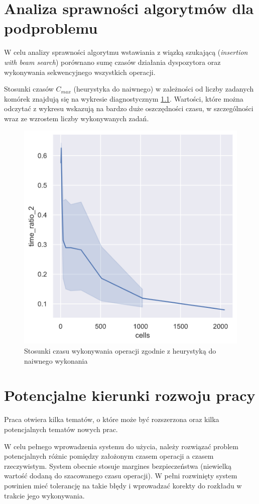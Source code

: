 \documentclass[brudnopis]{xmgr}
\begin{document}
\chapter{Analiza sprawności algorytmów dla podproblemu}

W celu analizy sprawności algorytmu wstawiania z wiązką szukającą (\emph{insertion with beam search}) porównano sumę czasów działania dyspozytora oraz wykonywania sekwencyjnego wszystkich operacji.

Stosunki czasów $C_{max}$ (heurystyka do naiwnego) w zależności od liczby zadanych komórek znajdują się na wykresie diagnostycznym \ref{diag:time_ratio_2}. Wartości, które można odczytać z wykresu wskazują na bardzo duże oszczędności czasu, w szczególności wraz ze wzrostem liczby wykonywanych zadań.

\begin{figure}[!tbh]
\centering
\includegraphics[width=.7\hsize]{fig/time_ratio_2.png}
\caption{Stosunki czasu wykonywania operacji zgodnie z heurystyką do naiwnego wykonania \label{diag:time_ratio_2}}
\end{figure}\medskip



\chapter{Potencjalne kierunki rozwoju pracy} \label{chap:extend}

Praca otwiera kilka tematów, o które może być rozszerzona oraz kilka potencjalnych tematów nowych prac.
\medskip

W celu pełnego wprowadzenia systemu do użycia, należy rozwiązać problem potencjalnych różnic pomiędzy założonym czasem operacji a czasem rzeczywistym. System obecnie stosuje margines bezpieczeństwa (niewielką wartość dodaną do szacowanego czasu operacji).
W pełni rozwinięty system powinien mieć tolerancję na takie błędy i wprowadzać korekty do rozkładu w trakcie jego wykonywania.
\medskip
\end{document}

